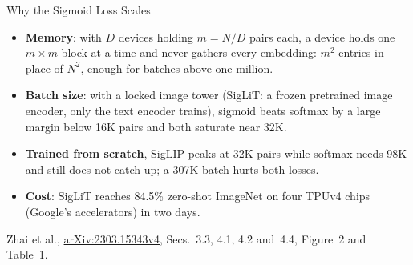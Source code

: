\begin{frame}{Why the Sigmoid Loss Scales}
  \begin{itemize}\itemsep0.6em
    \item \textbf{Memory}: with $D$ devices holding $m=N/D$ pairs each, a device holds one $m\times m$ block at a time and never gathers every embedding: $m^2$ entries in place of $N^2$, enough for batches above one million.
    \item \textbf{Batch size}: with a locked image tower (SigLiT: a frozen pretrained image encoder, only the text encoder trains), sigmoid beats softmax by a large margin below 16K pairs and both saturate near 32K.
    \item \textbf{Trained from scratch}, SigLIP peaks at 32K pairs while softmax needs 98K and still does not catch up; a 307K batch hurts both losses.
    \item \textbf{Cost}: SigLiT reaches 84.5\% zero-shot ImageNet on four TPUv4 chips (Google's accelerators) in two days.
  \end{itemize}
  \vspace{0.6em}
  {\scriptsize Zhai et al., \href{https://arxiv.org/abs/2303.15343v4}{arXiv:2303.15343v4}, Secs.~3.3, 4.1, 4.2 and~4.4, Figure~2 and Table~1.\par}
\end{frame}


